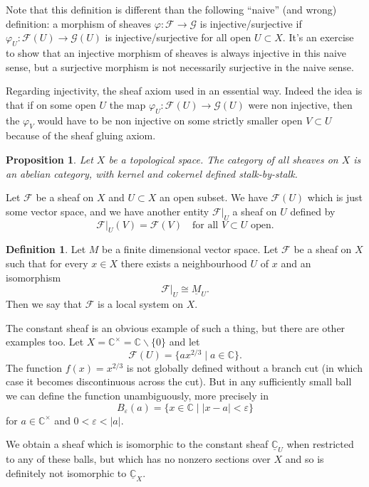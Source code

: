 \documentclass[12pt]{article}
\theoremstyle{plain}
\newtheorem{prop}[thm]{Proposition}
\theoremstyle{definition}
\newtheorem{defn}{Definition}[section]
\numberwithin{equation}{section}
\newcommand{\C}{\mathbb{C}}
\newcommand{\CF}{\mathcal{F}}
\newcommand{\CG}{\mathcal{G}}
\begin{document}
Note that this definition is different than the following ``naive'' (and wrong) definition: a morphism of sheaves $\varphi : \CF \rightarrow \CG$ is injective/surjective if $\varphi_U : \CF(U) \rightarrow \CG(U)$ is injective/surjective for all open $U \subset X$. It's an exercise to show that an injective morphism of sheaves is always injective in this naive sense, but a surjective morphism is not necessarily surjective in the naive sense.

Regarding injectivity, the sheaf axiom used in an essential way. Indeed the idea is that if on some open $U$ the map $\varphi_U : \CF(U) \rightarrow \CG(U)$ were non injective, then the $\varphi_V$ would have to be non injective on some strictly smaller open $V \subset U$ because of the sheaf gluing axiom.

\begin{prop}
Let $X$ be a topological space. The category of all sheaves on $X$ is an abelian category, with kernel and cokernel defined stalk-by-stalk.
\end{prop}

Let $\CF$ be a sheaf on $X$ and $U \subset X$ an open subset. We have $\CF(U)$ which is just some vector space, and we have another entity $\CF|_{U}$ a sheaf on $U$ defined by
\[
\CF|_{U}(V) = \CF(V) \quad \text{for all $V \subset U$ open}.
\]


\begin{defn}
Let $M$ be a finite dimensional vector space. Let $\CF$ be a sheaf on $X$ such that for every $x \in X$ there exists a neighbourhood $U$ of $x$ and an isomorphism
\[
\CF|_U \cong \underline{M}_U.
\]
Then we say that $\CF$ is a local system on $X$.
\end{defn}

The constant sheaf is an obvious example of such a thing, but there are other examples too. Let $X = \C^\times = \C \backslash \{0\}$ and let
\[
\CF(U) = \{a x^{2/3} \mid a \in \C\}.
\]
The function $f(x) = x^{2/3}$ is not globally defined without a branch cut (in which case it becomes discontinuous across the cut). But in any sufficiently small ball we can define the function unambiguously, more precisely in
\[
B_\varepsilon(a) = \{x \in \C \mid |x-a| < \varepsilon\}
\]
for $a \in \C^\times$ and $0 < \varepsilon < |a|$.

We obtain a sheaf which is isomorphic to the constant sheaf $\underline{\C}_U$ when restricted to any of these balls, but which has no nonzero sections over $X$ and so is definitely not isomorphic to $\underline{\C}_X$.
\end{document}
